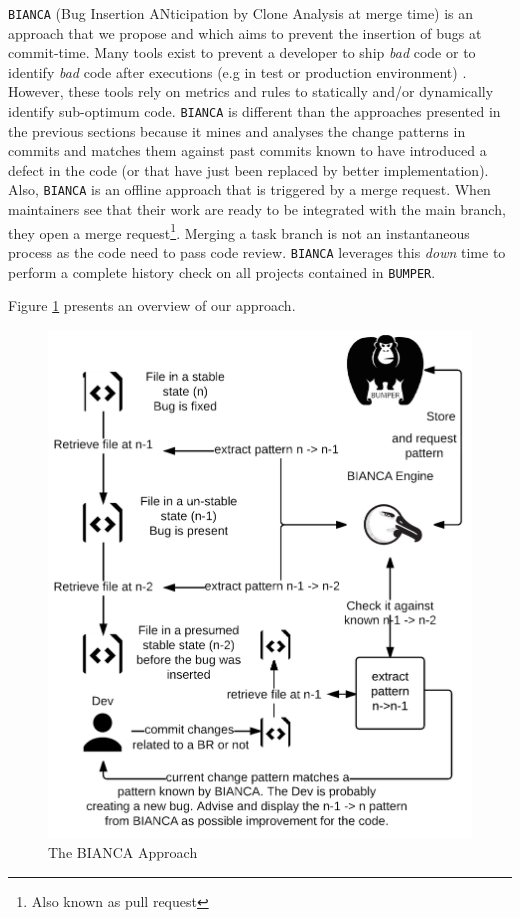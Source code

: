 

{\tt BIANCA} (Bug Insertion ANticipation by Clone Analysis at merge time) is an approach that we propose and which aims to prevent the insertion of bugs at commit-time. Many tools exist to prevent a developer to ship {\it bad} code \cite{Dangel2000,Hovemeyer2007,Moha2010} or to identify {\it bad} code after executions (e.g in test or production environment) \cite{Nayrolles,Nayrolles2013a}. However, these tools rely on metrics and rules to statically and/or dynamically identify sub-optimum code. {\tt BIANCA} is different than the approaches presented in the previous sections because it mines and analyses the change patterns in commits and matches them against past commits known to have introduced a defect in the code (or that have just been replaced by better implementation).
Also, {\tt BIANCA} is an offline approach that is triggered by a merge request.
When  maintainers see that their work are ready to be integrated with the main branch, they open a merge request\footnote{Also known as pull request}.
Merging a task branch is not an instantaneous process as the code need to pass code review.
{\tt BIANCA} leverages this {\it down} time to perform a complete history check on all projects contained in {\tt BUMPER}.

Figure \ref{fig:bianca-approach} presents an overview of our approach.

\begin{figure}[h!]
  \centering
    \includegraphics{media/bianca-approach.png}
    \caption{The BIANCA Approach
    \label{fig:bianca-approach}}
\end{figure}

